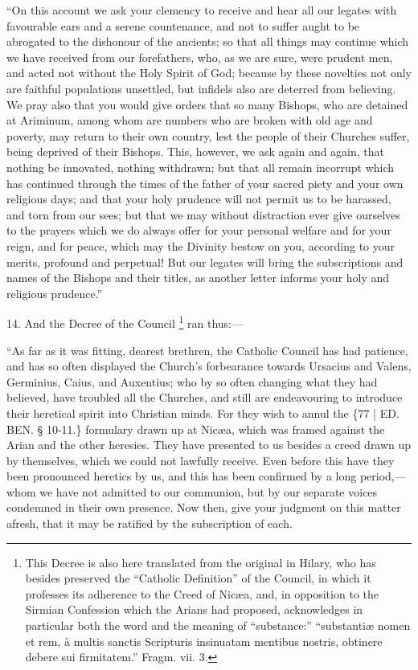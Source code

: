 ``On this account we ask your
clemency to receive and hear all our legates with favourable ears and
a serene countenance, and not to suffer aught to be abrogated to the
dishonour of the ancients; so that all things may continue which we
have received from our forefathers, who, as we are sure, were prudent
men, and acted not without the Holy Spirit of God; because by
these novelties not only are faithful populations unsettled, but
infidels also are deterred from believing. We pray also that you would
give orders that so many Bishops, who are detained at Ariminum, among
whom are numbers who are broken with old age and poverty, may return
to their own country, lest the people of their Churches suffer, being
deprived of their Bishops. This, however, we ask again and again, that
nothing be innovated, nothing withdrawn; but that all remain incorrupt
which has continued through the times of the father of your sacred
piety and your own religious days; and that your holy prudence will
not permit us to be harassed, and torn from our sees; but that we may
without distraction ever give ourselves to the prayers which we do
always offer for your personal welfare and for your reign, and for
peace, which may the Divinity bestow on you, according to your merits,
profound and perpetual! But our legates will bring the subscriptions
and names of the Bishops and their titles, as another letter informs
your holy and religious prudence.''

14. And the Decree of the
Council \footnote{This Decree is also here translated from the original in Hilary, who
has besides preserved the ``Catholic Definition'' of the Council, in
which it professes its adherence to the Creed of Nicæa, and, in
opposition to the Sirmian Confession which the Arians had proposed,
acknowledges in particular both the word and the meaning of
``substance:'' ``substantiæ nomen et rem, à multis sanctis
Scripturis insinuatam mentibus nostris, obtinere debere sui firmitatem.''
Fragm. vii. 3.} ran thus:—

``As far as it was fitting,
dearest brethren, the Catholic Council has had patience, and has so
often displayed the Church's forbearance towards Ursacius and Valens,
Germinius, Caius, and Auxentius; who by so often changing what they
had believed, have troubled all the Churches, and still are
endeavouring to introduce their heretical spirit into Christian minds.
For they wish to annul the \{77 | ED.
BEN. § 10-11.\} formulary drawn up at Nicæa,
which was framed against the Arian and the other heresies. They have
presented to us besides a creed drawn up by themselves, which we could
not lawfully receive. Even before this have they been pronounced
heretics by us, and this has been confirmed by a long period,—whom
we have not admitted to our communion, but by our separate voices
condemned in their own presence. Now then, give your judgment on this
matter afresh, that it may be ratified by the subscription of each.

